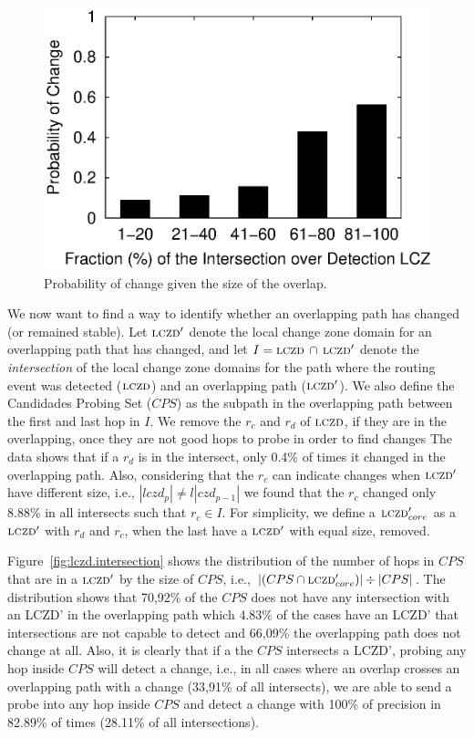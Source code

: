 \begin{figure}
\begin{center}
\includegraphics[width=0.8\columnwidth]{figs/patching/probchange/probchange.eps}
\caption{Probability of change given the size of the overlap. }
\label{fig:overlap.change.prob}
\end{center}
%
\end{figure}
%

We now want to find a way to identify whether an overlapping path
has changed (or remained stable).  Let $\mathrm{\textsc{lczd}}'$ denote the local
change zone domain for an overlapping path that has changed, and let
$I = \mathrm{\textsc{lczd}}\,\cap\,\mathrm{\textsc{lczd}}'$ denote the \emph{intersection} of the
local change zone domains for the path where the routing event was
detected ($\mathrm{\textsc{lczd}}$) and an overlapping path ($\mathrm{\textsc{lczd}}'$).
We also define the Candidades Probing Set ($CPS$) as the subpath 
in the overlapping path between the first and last hop in $I$.
We remove the $r_c$ and $r_d$ of $\mathrm{\textsc{lczd}}$, if they are in the overlapping,
once they are not good hops to probe in order to find changes
The data shows that if a $r_d$ is in the intersect, only 0.4\% of times
it changed in the overlapping path. Also, considering that the $r_c$ can
indicate changes when $\mathrm{\textsc{lczd}}'$ have different size, i.e., $|lczd_{p}| \ne l|czd_{p-1}| $ 
we found that the $r_c$ changed only 8.88\% in all intersects such that $r_c \in I$.
For simplicity, we define a $\mathrm{\textsc{lczd}}'_{core}$ as a $\mathrm{\textsc{lczd}}'$ with $r_d$ and $r_c$,
when the last have a $\mathrm{\textsc{lczd}}'$ with equal size, removed.


Figure~\ref{fig:lczd.intersection} shows the distribution of the
number of hops in $CPS$ that are in a $\mathrm{\textsc{lczd}}'$ by the
size of $CPS$,
i.e., $|(CPS \cap \mathrm{\textsc{lczd}}'_{core})| \div |CPS|$.  The distribution shows that 
70,92\% of the $CPS$ does not have any intersection with 
an LCZD' in the overlapping path which 4.83\% of the cases
have an LCZD' that intersections are not capable to detect and 66,09\%
the overlapping path does not change at all. Also, it is clearly that if a 
the $CPS$ intersects a LCZD', probing any hop inside $CPS$ will detect
a change, i.e., in all cases where an overlap crosses an overlapping path
with a change (33,91\% of all intersects), we are able to send a probe into any hop inside
$CPS$ and detect a change with 100\% of precision in 82.89\% of times (28.11\% of all intersections).

